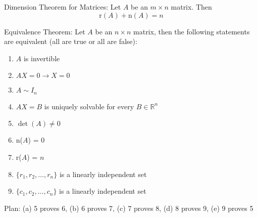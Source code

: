 \documentclass[12pt]{article}
\begin{document}
\begin{theorem} Dimension Theorem for Matrices: Let $A$ be an $m \times n$ matrix. Then $$ \text{r}(A) + \text{n}(A) = n$$ \end{theorem} 
\begin{theorem} Equivalence Theorem: Let $A$ be an $n \times n$ matrix, then the following statements are equivalent (all are true or all are false): \begin{enumerate} 
\item $A$ is invertible \item $AX = 0 \rightarrow X = 0$ \item $A \sim I_n$ \item $AX = B$ is uniquely solvable for every $B \in \mathbb{R}^n$ \item $\det(A) \neq 0$ \item n($A$) = 0 \item r($A$) = $n$ \item $\{r_1, r_2, \dots, r_n\}$ is a linearly independent set \item $\{c_1, c_2, \dots, c_n\}$ is a linearly independent set \end{enumerate} \end{theorem} Plan: (a) 5 proves 6, (b) 6 proves 7, (c) 7 proves 8, (d) 8 proves 9, (e) 9 proves 5 
\end{document}
